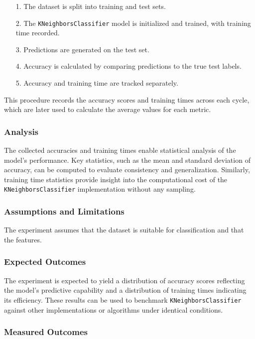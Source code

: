 \documentclass{article}
\theoremstyle{plain}
\theoremstyle{definition}
\theoremstyle{remark}
\begin{document}
\begin{itemize}
	\item [1.] The dataset is split into training and test sets.
	\item [2.] The \texttt{KNeighborsClassifier} model is initialized and trained, with training time recorded.
	\item [3.] Predictions are generated on the test set.
	\item [4.] Accuracy is calculated by comparing predictions to the true test labels.
	\item [5.] Accuracy and training time are tracked separately.
\end{itemize}

This procedure records the accuracy scores and training times across each cycle, which are later used to calculate the average values for each metric.


\subsubsection{Analysis}

The collected accuracies and training times enable statistical analysis of the model's performance. Key statistics, such as the mean and standard deviation of accuracy, can be computed to evaluate consistency and generalization. Similarly, training time statistics provide insight into the computational cost of the \texttt{KNeighborsClassifier} implementation without any sampling.


\subsubsection{Assumptions and Limitations}

The experiment assumes that the dataset is suitable for classification and that the features.


\subsubsection{Expected Outcomes}

The experiment is expected to yield a distribution of accuracy scores reflecting the model's predictive capability and a distribution of training times indicating its efficiency. These results can be used to benchmark \texttt{KNeighborsClassifier} against other implementations or algorithms under identical conditions.

\subsubsection{Measured Outcomes}
\end{document}
